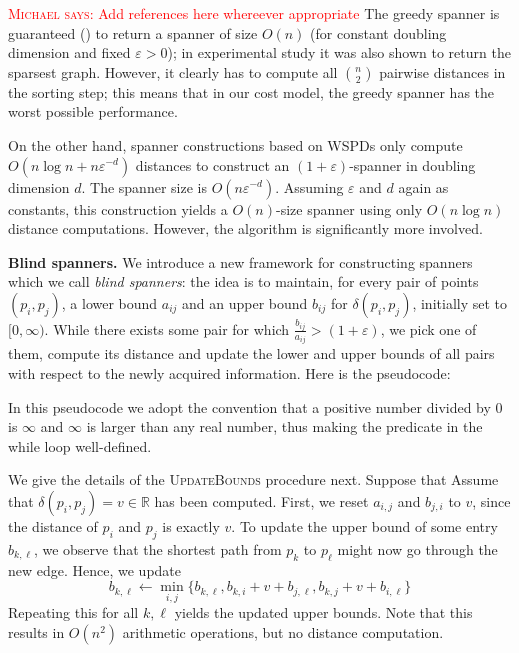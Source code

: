 \documentclass[a4paper,USenglish]{socg-lipics-v2018}
\newcommand{\R}{\mathbb{R}}
\newcommand{\eps}{\varepsilon}
\newcommand{\dist}{\delta}
\newcommand{\myparagraph}[1]{\textbf{#1.}}
\def\marrow{\marginpar[\hfill$\longrightarrow$]{$\longleftarrow$}}
\def\michael#1{\textcolor{red}{\textsc{Michael says: }{\marrow\sf #1}}}
\begin{document}
\michael{Add references here whereever appropriate}
The greedy spanner is guaranteed (\cite{althofer1993sparse}) to return a spanner of size $O(n)$
(for constant doubling dimension and fixed $\eps>0$); in experimental study \cite{farshi2009experimental}
it was also shown to return the sparsest graph. However, it clearly
has to compute all $\binom{n}{2}$ pairwise distances in the sorting step;
this means that in our cost model, the greedy spanner has the worst possible
performance.

On the other hand, spanner constructions based on WSPDs only compute
$O(n\log n+n \eps^{-d})$ distances 
to construct an $(1+\eps)$-spanner in doubling dimension $d$.
The spanner size is $O(n\eps^{-d})$. Assuming $\eps$ and $d$ again as constants,
this construction yields a $O(n)$-size spanner using only $O(n\log n)$ distance
computations. However, the algorithm is significantly more involved.

\myparagraph{Blind spanners}
%
We introduce a new framework for constructing spanners
which we call \emph{blind spanners}: the idea is to maintain,
for every pair of points $(p_i,p_j)$,
a lower bound $a_{ij}$ and an upper bound $b_{ij}$ for $\dist(p_i,p_j)$,
initially set to $[0,\infty)$. While there exists some pair for which $\frac{b_{ij}}{a_{ij}}>(1+\eps)$,
we pick one of them, compute its distance and update the lower and upper bounds of
all pairs with respect to the newly acquired information. Here is the pseudocode:

\begin{algorithmic}
\label{alg:blind_spanner}
\Function{BlindSpanner}{$P, \eps$}
    \While {$\exists i \neq j : b_{i,j} / a_{i,j} > 1 + \eps$}
     
    \State {$v \gets \dist(p_i, pj)$}
    \State {}
    \EndWhile
\EndFunction
\end{algorithmic}


In this pseudocode we adopt the convention that a positive number divided by 0 is $\infty$
and $\infty$ is larger than any real number,
thus making the predicate in the while loop well-defined.  

We give the details of the \textsc{UpdateBounds} procedure next.
Suppose that
Assume that $\dist(p_i,p_j)=v\in\R$ has been computed.
First, we reset $a_{i,j}$ and $b_{j,i}$ to $v$, since the distance
of $p_i$ and $p_j$ is exactly $v$.
To update the upper bound of some entry $b_{k,\ell}$,
we observe that the shortest path from $p_k$ to $p_\ell$ might now
go through the new edge. Hence, we update
\[
    b_{k,\ell}\gets \min_{i,j}\{b_{k,\ell},b_{k,i}+v+b_{j,\ell},b_{k,j}+v+b_{i,\ell}\}
\]
Repeating this for all $k,\ell$ yields the updated upper bounds.
Note that this results in $O(n^2)$ arithmetic operations,
but no distance computation.
\end{document}
